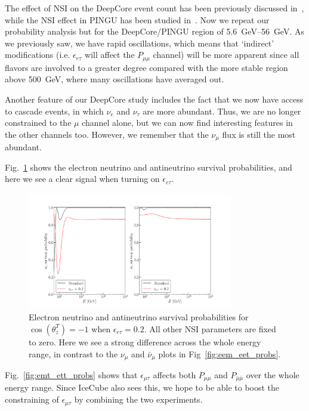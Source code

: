 \documentclass{revtex4-2}
\newcommand{\ztrue}{\ensuremath{\cos{(\theta_z^{T})}}}
\newcommand{\emt}{\ensuremath{\epsilon_{\mu\tau}}}
\newcommand{\eet}{\epsilon_{e\tau}}
\renewcommand{\ne}{\nu_e}
\newcommand{\nm}{\nu_\mu}
\newcommand{\nt}{\nu_\tau}
\newcommand{\anm}{\bar\nu_\mu}
\newcommand{\Pmm}{P_{\mu\mu}}
\newcommand{\Pamam}{P_{\bar{\mu}  \bar{\mu}}}
\begin{document}
The effect of NSI on the DeepCore event count has been previously discussed in~\cite{smirnovNSI}, while the NSI effect 
in PINGU has been studied in~\cite{choubey2014, ohlsson2013}.
Now we repeat our probability analysis but for the DeepCore/PINGU region of \SIrange{5.6}{56}{\GeV}. As we previously saw,
we have rapid oscillations, which means that `indirect' modifications (i.e. $\eet$ will affect the $\Pmm$ channel)
will be more apparent since all flavors are involved to a greater degree compared with the more stable region above \SI{500}{\GeV}, where 
many oscillations have averaged out.

Another feature of our DeepCore study includes the fact that we now have access to cascade events, in which $\ne$ and $\nt$ are more abundant.
Thus, we are no longer constrained to the $\mu$ channel alone, but we can now find interesting features in the other channels too. However, we 
remember that the $\nm$ flux is still the most abundant.

Fig.~\ref{fig:Pee_eet_probs} shows the electron neutrino and antineutrino survival probabilities, and here we see
a clear signal when turning on $\eet$. 

\begin{figure}
    \begin{center}
        \includegraphics[width=0.8\textwidth]{figures/Pee_eet_probs.pdf}
        \caption{Electron neutrino and antineutrino survival probabilities for
        $\ztrue = -1$ when $\eet = 0.2$. All other NSI parameters are fixed to zero. 
        Here we see a strong difference across the whole energy range, in contrast to the $\nm$ and $\anm$ plots in Fig~\ref{fig:eem_eet_probs}.}
        \label{fig:Pee_eet_probs}
    \end{center}
\end{figure}

Fig.~\ref{fig:emt_ett_probs} shows that $\emt$ affects both $\Pmm$ and $\Pamam$ over the whole energy range. Since 
IceCube also sees this, we hope to be able to boost the constraining of $\emt$ by combining the two experiments.
\end{document}
